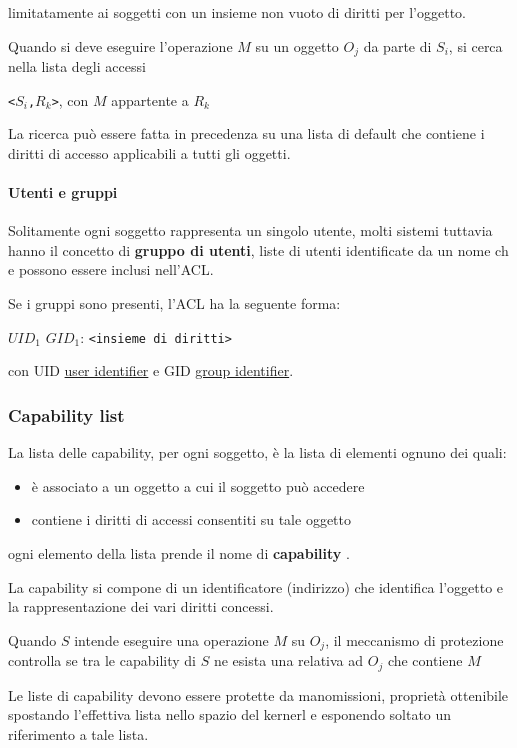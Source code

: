 limitatamente ai soggetti con un insieme non vuoto di diritti per l'oggetto.

Quando si deve eseguire l'operazione $M$ su un oggetto $O_j$ da parte di $S_i$, si cerca nella lista degli accessi 

{\centering
\texttt{<$S_i$,$R_k$>}, con $M$ appartente a $R_k$\par}   

La ricerca può essere fatta in precedenza su una lista di default che contiene i diritti di accesso applicabili a tutti gli oggetti.

\paragraph{Utenti e gruppi} Solitamente ogni soggetto rappresenta un singolo utente, molti sistemi tuttavia hanno il concetto di \textbf{gruppo di utenti}, liste di utenti identificate da un nome ch e possono essere inclusi nell'ACL.

Se i gruppi sono presenti, l'ACL ha la seguente forma:

{\centering
$UID_1$ $GID_1$: \texttt{<insieme di diritti>} \par}   

con UID \underline{user identifier} e GID \underline{group identifier}.

\subsubsection{Capability list}
La lista delle capability, per ogni soggetto, è la lista di elementi ognuno dei quali:
\begin{itemize}
    \item è associato a un oggetto a cui il soggetto può accedere
    \item contiene i diritti di accessi consentiti su tale oggetto
\end{itemize}
ogni elemento della lista prende il nome di \textbf{capability} .

La capability si compone di un identificatore (indirizzo) che identifica l'oggetto e la rappresentazione dei vari diritti concessi.

Quando $S$ intende eseguire una operazione $M$ su $O_j$, il meccanismo di protezione controlla se tra le capability di $S$ ne esista una relativa ad $O_j$ che contiene $M$

Le liste di capability devono essere protette da manomissioni, proprietà ottenibile spostando l'effettiva lista nello spazio del kernerl e esponendo soltato un riferimento a tale lista.

